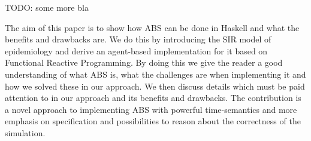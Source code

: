 TODO: some more bla

The aim of this paper is to show how ABS can be done in Haskell and what the benefits and drawbacks are. We do this by introducing the SIR model of epidemiology and derive an agent-based implementation for it based on Functional Reactive Programming. By doing this we give the reader a good understanding of what ABS is, what the challenges are when implementing it and how we solved these in our approach. We then discuss details which must be paid attention to in our approach and its benefits and drawbacks. The contribution is a novel approach to implementing ABS with powerful time-semantics and more emphasis on specification and possibilities to reason about the correctness of the simulation.